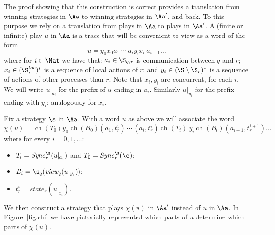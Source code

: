 \documentclass{llncs}
\newcommand{\Sync}{\mathit{Sync}}
\newcommand{\state}{\mathit{state}}
\newcommand{\view}{\mathit{view}}
\newcommand{\ch}{\mathop{ch}}
\begin{document}
The proof showing that this construction is correct provides a
translation from winning strategies in $\Aa$ to winning strategies in
$\Aa'$, and back. To this purpose we rely on a
translation from plays in $\Aa$ to plays in $\Aa'$. A (finite or
infinite) play $u$ in $\Aa$ is a trace that will be convenient
to view as a word of the form
\begin{equation*}
u = y_0 x_0a_1\    \cdots\ a_i y_i x_i\ a_{i+1}\dots
\end{equation*}
where for $i\in \Nat$ we have that: $a_i \in \S_{q,r}$ is communication between $q$ and $r$; $x_i
\in (\S^{loc}_r)^*$ is a sequence of local actions of $r$; and $y_i\in (\S
\setminus \S_r)^*$ is a sequence of actions of other processes than $r$. Note that $x_i,y_i$ are
concurrent, for each $i$. We will write $u|_{a_i}$ for the prefix of
$u$ ending in $a_i$. Similarly $u|_{y_i}$ for the prefix ending with 
$y_i$; analogously for $x_i$.

Fix a strategy $\s$ in $\Aa$. With a word $u$ as above we will associate the word
\[  \chi(u)=\ch(T_0)y_0\ch(B_0)(a_1,t^1_r)\, \cdots \,
(a_i,t^i_r)\ch(T_i)\ y_i\ch(B_i)(a_{i+1},t^{i+1}_r)\dots
\]
where for every $i=0,1,\dots$:
\begin{itemize}
\item $T_i=\Sync^\s_r(u|_{a_i})$ and $T_0=\Sync^\s_r(\e)$;
\item $B_i=\s_q(\view_q(u|_{y_i}))$;
\item $t^i_r=\state_r(u|_{x_i})$.
\end{itemize}
We then construct a strategy that plays $\chi(u)$ in $\Aa'$ instead of
$u$ in $\Aa$. In Figure~\ref{fig:chi} we have pictorially represented
which parts of $u$ determine which parts of $\chi(u)$.

\begin{figure*}[tbhf]
  \centering
{}
  \caption{Definition of $\chi(u)$}
  \label{fig:chi}
\end{figure*}
\end{document}
